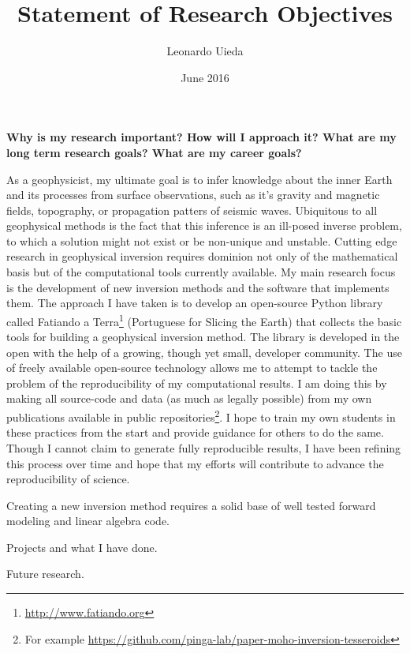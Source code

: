 \documentclass[12pt]{article}
\title{\textbf{Statement of Research Objectives}}
\author{Leonardo Uieda}
\date{June 2016}
\begin{document}
\maketitle


\textbf{Why is my research important?
How will I approach it?
What are my long term research goals?
What are my career goals?}

As a geophysicist,
my ultimate goal is
to infer knowledge about the inner Earth
and its processes
from surface observations,
such as it's gravity and magnetic fields,
topography,
or propagation patters of seismic waves.
%
Ubiquitous to all geophysical methods is
the fact that this inference is
an ill-posed inverse problem,
to which a solution might not exist or be non-unique and unstable.
%
Cutting edge research
in geophysical inversion
requires dominion not only of the mathematical basis
but of the computational tools currently available.
%
My main research focus is
the development of new inversion methods
and the software that implements them.
%
The approach I have taken is
to develop an open-source Python library
called Fatiando a Terra\footnote{\url{http://www.fatiando.org}}
(Portuguese for Slicing the Earth)
that collects the basic tools
for building a geophysical inversion method.
%
The library is developed in the open
with the help of a growing, though yet small,
developer community.
%
The use of freely available open-source technology
allows me to attempt to tackle
the problem of the reproducibility of my computational results.
%
I am doing this by
making all source-code and data (as much as legally possible)
from my own publications
available in public
repositories\footnote{For example
\url{https://github.com/pinga-lab/paper-moho-inversion-tesseroids}}.
%
I hope to train my own students
in these practices from the start
and provide guidance for others to do the same.
%
Though I cannot claim
to generate fully reproducible results,
I have been refining this process over time
and hope that my efforts will contribute
to advance the reproducibility of science.


Creating a new inversion method
requires a solid base of well tested
forward modeling and linear algebra code.
%




Projects and what I have done.

Future research.
\end{document}
